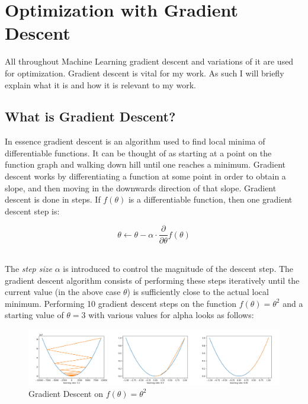 \section{Optimization with Gradient Descent}\label{gd}
All throughout Machine Learning gradient descent and variations of it are used for optimization. Gradient descent is vital for my work. As such I will briefly explain what it is and how it is relevant to my work.

\subsection{What is Gradient Descent?}\label{gd:what_is_it}
In essence gradient descent is an algorithm used to find local minima of differentiable functions. It can be thought of as starting at a point on the function graph and walking down hill until one reaches a minimum. Gradient descent works by differentiating a function at some point in order to obtain a slope, and then moving in the downwards direction of that slope. Gradient descent is done in steps. If $f(\theta)$ is a differentiable function, then one gradient descent step is:

\begin{equation}\label{Graident_Descent:basic_update}
    \theta \leftarrow \theta - \alpha \cdot \frac{\partial}{\partial \theta}f(\theta)
\end{equation}

\noindent
\\ The \textit{step size} $\alpha$ is introduced to control the magnitude of the descent step. The gradient descent algorithm consists of performing these steps iteratively until the current value (in the above case $\theta$) is sufficiently close to the actual local minimum. Performing 10 gradient descent steps on the function $f(\theta) = \theta^2$ and a starting value of $\theta = 3$ with various values for alpha looks as follows:

\begin{figure}[ht]
    \centering
    \includegraphics[width=\linewidth]{figures/grad_desc.png}
    \caption{Gradient Descent on $f(\theta) = \theta^2$}
    \label{fig:UNO}
\end{figure}

